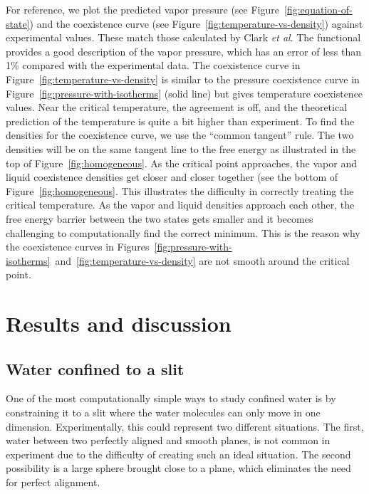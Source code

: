 \documentclass[letterpaper,twocolumn,amsmath,amssymb,prb]{revtex4-1}
\begin{document}
For reference, we plot the predicted vapor pressure (see
Figure~\ref{fig:equation-of-state}) and the coexistence curve (see
Figure~\ref{fig:temperature-vs-density}) against experimental values.  These
match those calculated by Clark \emph{et al}. The functional provides a good description of
the vapor pressure, which has an error of less than 
1\% compared with the experimental data. The coexistence curve in 
Figure~\ref{fig:temperature-vs-density} is similar to the pressure coexistence
curve in Figure~\ref{fig:pressure-with-isotherms} (solid line) but gives 
temperature coexistence values.
Near the critical temperature,
the agreement is off, and the theoretical prediction  of the temperature is quite a bit higher than
experiment. 
To find the densities for the coexistence curve, we use the
``common tangent'' rule. The two densities 
will be on the same tangent line to the free energy as illustrated in the top of Figure~\ref{fig:homogeneous}.
As the critical point approaches, the vapor and liquid coexistence densities get closer and closer together 
(see the bottom of Figure~\ref{fig:homogeneous}. This illustrates the difficulty
in correctly treating the critical temperature. As the vapor and liquid densities approach
each other, the free energy barrier between the two states gets smaller and it becomes
challenging to computationally find the correct minimum. This is the reason 
why the coexistence curves
in Figures~\ref{fig:pressure-with-isotherms}~and~\ref{fig:temperature-vs-density}
are not smooth around the critical point.

\section{Results and discussion}

\subsection{Water confined to a slit}

One of the most computationally simple ways to study confined water is by
constraining it to a slit where the water molecules can only move in one
dimension. Experimentally, this could represent two different situations.
The first, water between two perfectly aligned and smooth planes, is not common 
in experiment due to the difficulty of creating such an ideal situation. The
second
possibility is a large sphere brought close to a plane, which eliminates the 
need for perfect alignment.
\end{document}
